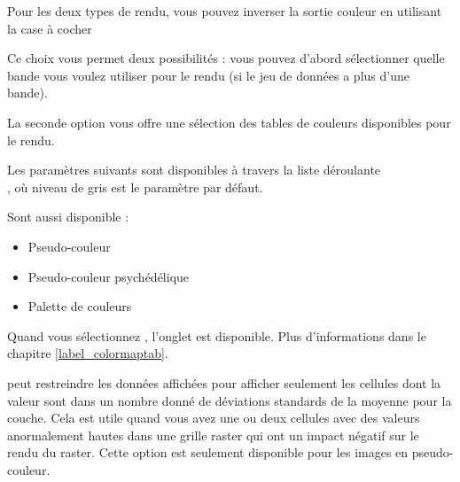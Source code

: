 Pour les deux types de rendu, vous pouvez inverser la sortie couleur en
utilisant la case à cocher 


Ce choix vous permet deux possibilités : vous pouvez d'abord sélectionner
quelle bande vous voulez utiliser pour le rendu (si le jeu de données a plus
d'une bande).

La seconde option vous offre une sélection des tables de couleurs disponibles
pour le rendu.

Les paramètres suivants sont disponibles à travers la liste déroulante\\
, où niveau de gris est le 
paramètre par défaut.

Sont aussi disponible :
\begin{itemize}[label=--]
\item Pseudo-couleur
\item Pseudo-couleur psychédélique
\item Palette de couleurs
\end{itemize}

Quand vous sélectionnez , l'onglet
 est disponible. Plus d'informations dans le chapitre
\ref{label_colormaptab}.

\qg peut restreindre les données affichées pour afficher seulement les
cellules dont la valeur sont dans un nombre donné de déviations standards de la moyenne pour la couche. Cela est utile quand vous avez une ou deux cellules avec des valeurs anormalement hautes dans une grille raster qui ont un impact négatif sur le rendu du raster. Cette option est seulement disponible pour les images en pseudo-couleur.

